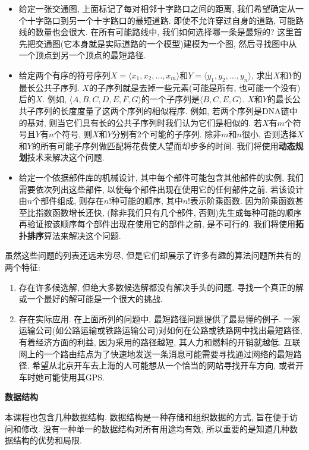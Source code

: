 \documentclass[oneside,10pt,fontset=none]{ctexbook}
\numberwithin{definition}{chapter}
\numberwithin{theorem}{chapter}
\numberwithin{lemma}{chapter}
\begin{document}
\begin{itemize}
    \item 给定一张交通图, 上面标记了每对相邻十字路口之间的距离, 我们希望确定从一个十字路口到另一个十字路口的最短道路. 即使不允许穿过自身的道路, 可能路线的数量也会很大. 在所有可能路线中, 我们如何选择哪一条是最短的? 这里首先把交通图(它本身就是实际道路的一个模型)建模为一个图, 然后寻找图中从一个顶点到另一个顶点的最短路径.
    \item 给定两个有序的符号序列$X = \langle x_1, x_2, \dots, x_m\rangle$和$Y=\langle y_1, y_2, \dots, y_n\rangle$, 求出$X$和$Y$的最长公共子序列. $X$的子序列就是去掉一些元素(可能是所有, 也可能一个没有)后的$X$. 例如, $\langle A, B, C, D, E, F, G\rangle$的一个子序列是$\langle B, C, E, G\rangle$. $X$和$Y$的最长公共子序列的长度度量了这两个序列的相似程序. 例如, 若两个序列是DNA链中的基对, 则当它们具有长的公共子序列时我们认为它们是相似的. 若$X$有$m$个符号且$Y$有$n$个符号, 则$X$和$Y$分别有2个可能的子序列. 除非$m$和$n$很小, 否则选择$X$和$Y$的所有可能子序列做匹配将花费使人望而却步多的时间. 我们将使用\textbf{动态规划}技术来解决这个问题.
    \item 给定一个依据部件库的机械设计, 其中每个部件可能包含其他部件的实例, 我们需要依次列出这些部件, 以使每个部件出现在使用它的任何部件之前. 若该设计由$n$个部件组成, 则存在$n!$种可能的顺序, 其中$n!$表示阶乘函数. 因为阶乘函数甚至比指数函数增长还快, (除非我们只有几个部件, 否则)先生成每种可能的顺序再验证按该顺序每个部件出现在使用它的部件之前, 是不可行的. 我们将使用\textbf{拓扑排序}算法来解决这个问题.
\end{itemize}

虽然这些问题的列表还远未穷尽, 但是它们却展示了许多有趣的算法问题所共有的两个特征:

\begin{enumerate}
    \item 存在许多候选解, 但绝大多数候选解都没有解决手头的问题. 寻找一个真正的解或一个最好的解可能是一个很大的挑战.
    \item 存在实际应用. 在上面所列的问题中, 最短路径问题提供了最易懂的例子. 一家运输公司(如公路运输或铁路运输公司)对如何在公路或铁路网中找出最短路径, 有着经济方面的利益, 因为采用的路径越短, 其人力和燃料的开销就越低. 互联网上的一个路由结点为了快速地发送一条消息可能需要寻找通过网络的最短路径. 希望从北京开车去上海的人可能想从一个恰当的网站寻找开车方向, 或者开车时她可能使用其GPS.
\end{enumerate}

\textbf{数据结构}

本课程也包含几种数据结构. 数据结构是一种存储和组织数据的方式, 旨在便于访问和修改. 没有一种单一的数据结构对所有用途均有效, 所以重要的是知道几种数据结构的优势和局限.
\end{document}
